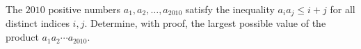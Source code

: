 The $2010$ positive numbers $a_1,a_2,\ldots,a_{2010}$ satisfy the inequality $a_ia_j\leq i+j$ for all distinct indices $i,j$. Determine, with proof, the largest possible value of the product $a_1a_2\cdots a_{2010}$.